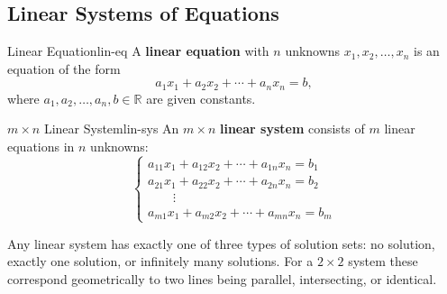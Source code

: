 \subsection{Linear Systems of Equations}

\begin{definition}{Linear Equation}{lin-eq}
  A \textbf{linear equation} with $n$ unknowns $x_1, x_2, \ldots, x_n$ is an equation of the form
  \[
    a_1 x_1 + a_2 x_2 + \cdots + a_n x_n = b,
  \]
  where $a_1, a_2, \ldots, a_n, b \in \mathbb{R}$ are given constants.
\end{definition}

\begin{definition}{$m \times n$ Linear System}{lin-sys}
  An $m \times n$ \textbf{linear system} consists of $m$ linear equations in $n$ unknowns:
  \[
    \begin{cases}
      a_{11}x_1 + a_{12}x_2 + \cdots + a_{1n}x_n = b_1 \\
      a_{21}x_1 + a_{22}x_2 + \cdots + a_{2n}x_n = b_2 \\
      \hspace{2em}\vdots                               \\
      a_{m1}x_1 + a_{m2}x_2 + \cdots + a_{mn}x_n = b_m
    \end{cases}
  \]
\end{definition}

Any linear system has exactly one of three types of solution sets: no solution, exactly one solution, or infinitely many solutions. For a $2 \times 2$ system these correspond geometrically to two lines being parallel, intersecting, or identical.

\begin{center}
\end{center}

